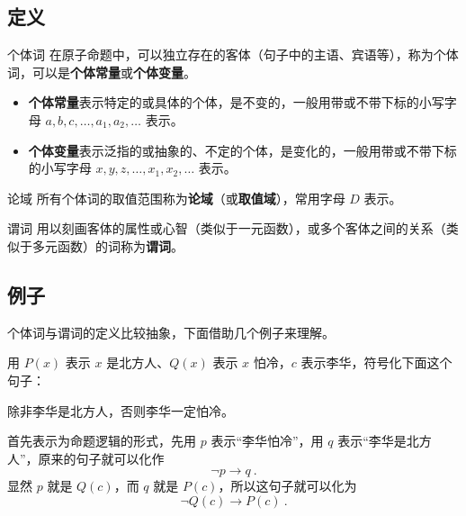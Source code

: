 

\subsection{定义}
\begin{definition}{个体词}
在原子命题中，可以独立存在的客体（句子中的主语、宾语等），称为个体词，可以是\textbf{个体常量}或\textbf{个体变量}。
\begin{itemize}
\item \textbf{个体常量}表示特定的或具体的个体，是不变的，一般用带或不带下标的小写字母 $a, b, c, \dots, a_1, a_2, \dots$ 表示。
\item \textbf{个体变量}表示泛指的或抽象的、不定的个体，是变化的，一般用带或不带下标的小写字母 $x, y, z, \dots, x_1, x_2, \dots$ 表示。
\end{itemize}

\end{definition}
\begin{definition}{论域}
所有个体词的取值范围称为\textbf{论域}（或\textbf{取值域}），常用字母 $D$ 表示。
\end{definition}


\begin{definition}{谓词}
用以刻画客体的属性或心智（类似于一元函数），或多个客体之间的关系（类似于多元函数）的词称为\textbf{谓词}。
\end{definition}

\subsection{例子}
个体词与谓词的定义比较抽象，下面借助几个例子来理解。

\begin{example}{}
用 $P(x)$ 表示 $x$ 是北方人、$Q(x)$ 表示 $x$ 怕冷，$c$ 表示李华，符号化下面这个句子：

除非李华是北方人，否则李华一定怕冷。
\end{example}
首先表示为命题逻辑的形式，先用 $p$ 表示“李华怕冷”，用 $q$ 表示“李华是北方人”，原来的句子就可以化作
\begin{equation}
\neg p \to  q ~.
\end{equation}
显然 $p$ 就是 $Q(c)$，而 $q$ 就是 $P(c)$，所以这句子就可以化为
\begin{equation}
\neg Q(c) \to  P(c) ~.
\end{equation}
